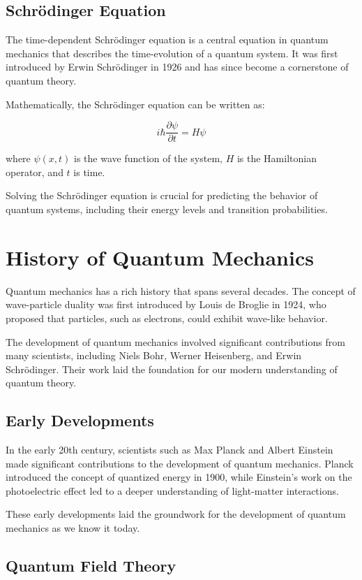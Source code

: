 \documentclass{report}%
\begin{document}
\subsection*{Schrödinger Equation}

The time-dependent Schrödinger equation is a central equation in quantum mechanics that describes the time-evolution of a quantum system. It was first introduced by Erwin Schrödinger in 1926 and has since become a cornerstone of quantum theory.

Mathematically, the Schrödinger equation can be written as:

\[
i\hbar \frac{\partial \psi}{\partial t} = H \psi
\]

where $\psi(x,t)$ is the wave function of the system, $H$ is the Hamiltonian operator, and $t$ is time.

Solving the Schrödinger equation is crucial for predicting the behavior of quantum systems, including their energy levels and transition probabilities.

\section*{History of Quantum Mechanics}

Quantum mechanics has a rich history that spans several decades. The concept of wave-particle duality was first introduced by Louis de Broglie in 1924, who proposed that particles, such as electrons, could exhibit wave-like behavior.

The development of quantum mechanics involved significant contributions from many scientists, including Niels Bohr, Werner Heisenberg, and Erwin Schrödinger. Their work laid the foundation for our modern understanding of quantum theory.

\subsection*{Early Developments}

In the early 20th century, scientists such as Max Planck and Albert Einstein made significant contributions to the development of quantum mechanics. Planck introduced the concept of quantized energy in 1900, while Einstein's work on the photoelectric effect led to a deeper understanding of light-matter interactions.

These early developments laid the groundwork for the development of quantum mechanics as we know it today.

\subsection*{Quantum Field Theory}
\end{document}
